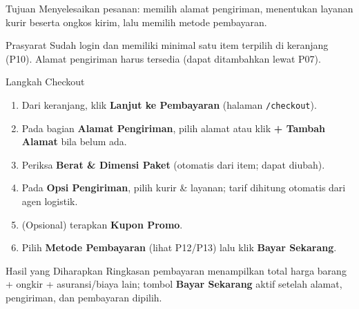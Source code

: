 
\begin{flowsection}{Tujuan}
Menyelesaikan pesanan: memilih alamat pengiriman, menentukan layanan kurir
beserta ongkos kirim, lalu memilih metode pembayaran.
\end{flowsection}

\begin{flowsection}{Prasyarat}
Sudah login dan memiliki minimal satu item terpilih di keranjang (P10). Alamat
pengiriman harus tersedia (dapat ditambahkan lewat P07).
\end{flowsection}

\begin{flowsection}{Langkah Checkout}
\begin{enumerate}
  \item Dari keranjang, klik \textbf{Lanjut ke Pembayaran} (halaman \texttt{/checkout}).
  \item Pada bagian \textbf{Alamat Pengiriman}, pilih alamat atau klik
        \textbf{+ Tambah Alamat} bila belum ada.
  \item Periksa \textbf{Berat \& Dimensi Paket} (otomatis dari item; dapat diubah).
  \item Pada \textbf{Opsi Pengiriman}, pilih kurir \& layanan; tarif dihitung
        otomatis dari agen logistik.
  \item (Opsional) terapkan \textbf{Kupon Promo}.
  \item Pilih \textbf{Metode Pembayaran} (lihat P12/P13) lalu klik
        \textbf{Bayar Sekarang}.
\end{enumerate}
\end{flowsection}


\begin{flowsection}{Hasil yang Diharapkan}
Ringkasan pembayaran menampilkan total harga barang + ongkir + asuransi/biaya
lain; tombol \textbf{Bayar Sekarang} aktif setelah alamat, pengiriman, dan
pembayaran dipilih.
\end{flowsection}


